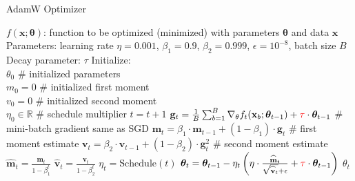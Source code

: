 \begin{algorithm}[H]
  \caption{AdamW Optimizer \citep[Algorithm 2]{loshchilov2019}}
  \begin{algorithmic}[1]\label{algo:optimizer-adamw}
    \Require $f \left(\mathbf{x}; \boldsymbol\theta\right)$:
    function to be optimized (minimized) with parameters $\boldsymbol\theta$ and data $\mathbf{x}$
    \Require Parameters: learning rate $\eta = 0.001$, $\beta_1 = 0.9$, $\beta_2 = 0.999$, $\epsilon = 10^{-8}$,
    batch size $B$
    \Require Decay parameter: {\color{red} $\tau$}
    \Require Initialize: \\
    $\theta_0$ \# initialized parameters\\
    $m_0 = 0$ \# initialized first moment\\
    $v_0 = 0$ \# initialized second moment\\
    $\eta_0 \in \mathbb{R}$ \# schedule multiplier
    \State $t = t + 1$
    \State $\mathbf{g}_t = \frac1B \sum_{b=1}^B \nabla_\theta f_t(\mathbf{x}_b; \boldsymbol\theta_{t-1})
      + \textcolor{red}{\tau} \cdot \boldsymbol\theta_{t-1}$
    \# mini-batch gradient same as SGD
    \State $\mathbf{m}_t = \beta_1 \cdot \mathbf{m}_{t-1} + (1 - \beta_1)\cdot \mathbf{g}_t$
    \# first moment estimate
    \State $\mathbf{v}_t = \beta_2 \cdot \mathbf{v}_{t-1} + (1 - \beta_2)\cdot \mathbf{g}_t^2$
    \# second moment estimate
    \State $\widehat{\mathbf{m}}_t = \frac{\mathbf{m}_t}{1 - \beta_1^t}$
    \State $\widehat{\mathbf{v}}_t = \frac{\mathbf{v}_t}{1 - \beta_2^t}$
    \State $\eta_t = \text{Schedule}(t)$
    \State $\boldsymbol\theta_t = \boldsymbol\theta_{t-1} -
      \eta_t \left(
      \eta\cdot \frac{\widehat{\mathbf{m}}_t}{\sqrt{\widehat{\mathbf{v}}_t}+\epsilon} +
      \textcolor{red}{\tau}\cdot \boldsymbol\theta_{t-1}
      \right)$
    \EndWhile
    \Ensure $\theta_t$
  \end{algorithmic}
\end{algorithm}
